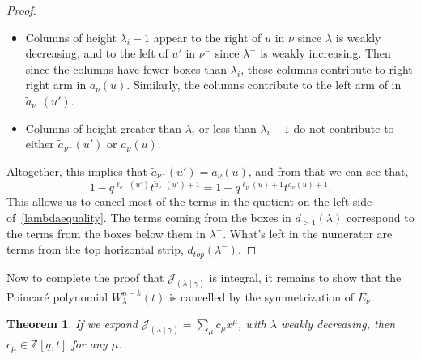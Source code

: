 \documentclass[11pt]{article}
\newtheorem{thm}[theo]{Theorem}
\theoremstyle{definition}
\numberwithin{equation}{section}
\newcommand{\Z}{\mathbb{Z}}
\newcommand{\JJ}{\mathcal{J}_{(\lambda \mid \gamma)}}
\newcommand{\numin}{{\nu^-}}
\begin{document}
\begin{proof}
\begin{itemize}
\item Columns of height $\lambda_i-1$ appear to the right of $u$ in $\nu$ since $\lambda$ is weakly decreasing, and to the left of $u'$ in $\numin$ since $\lambda^-$ is weakly increasing. Then since the columns have fewer boxes than $\lambda_i$, these columns contribute to right right arm in $a_\nu(u)$. Similarly, the columns contribute to the left arm of in~$\widetilde{a}_\numin(u')$.

\item Columns of height greater than $\lambda_i$ or less than $\lambda_i-1$ do not contribute to either $\widetilde{a}_\numin(u')$ or $a_\nu(u)$.


\end{itemize}
Altogether, this implies that $\widetilde{a}_\numin(u') = a_\nu(u)$, and from that we can see that, \[1-q^{\ell_\numin(u')}t^{\widetilde{a}_\numin(u') + 1} = 1-q^{\ell_\nu(u)+1}t^{a_\nu(u) +1}.\]
This allows us to cancel most of the terms in the quotient on the left side of~\eqref{lambdaequality}. The terms coming from the boxes in $d_{>1}(\lambda)$ correspond to the terms from the boxes below them in $\lambda^-$. What's left in the numerator are terms from the top horizontal strip, $d_{top}(\lambda^-)$.
\end{proof}

Now to complete the proof that $\JJ$ is integral, it remains to show that the Poincar\'e polynomial $W^{n-k}_\lambda(t)$ is cancelled by the symmetrization of $E_\nu$.

\begin{thm}\label{Integrality}
If we expand $\displaystyle{\JJ = \sum_\mu c_{ \mu} x^\mu}$, with $\lambda$ weakly decreasing, then \mbox{$c_{ \mu} \in \Z[q,t]$} for any $\mu$.
\end{thm}
\end{document}
